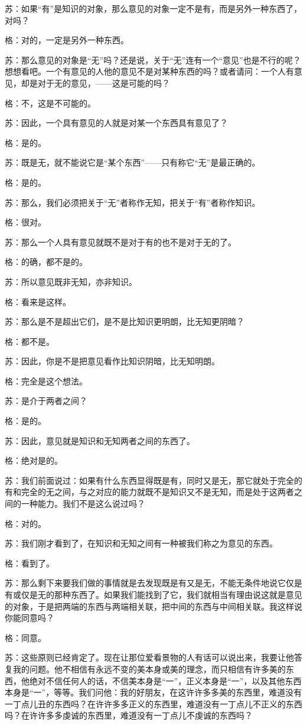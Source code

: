 \documentclass[12pt,oneside]{book}
\begin{document}
苏：如果“有”是知识的对象，那么意见的对象一定不是有，而是另外一种东西了，对吗？

格：对的，一定是另外一种东西。

苏：那么意见的对象是“无”吗？还是说，关于“无”连有一个“意见”也是不行的呢？想想看吧。一个有意见的人他的意见不是对某种东西的吗？或者请问：一个人有意见，却是对于无的意见，——这是可能的吗？

格：不，这是不可能的。

苏：因此，一个具有意见的人就是对某一个东西具有意见了？

格：是的。

苏：既是无，就不能说它是“某个东西”——只有称它“无”是最正确的。

格：是的。

苏：那么，我们必须把关于“无”者称作无知，把关于“有”者称作知识。

格：很对。

苏：那么一个人具有意见就既不是对于有的也不是对于无的了。

格：的确，都不是的。

苏：所以意见既非无知，亦非知识。

格：看来是这样。

苏：那么是不是超出它们，是不是比知识更明朗，比无知更阴暗？

格：都不是。

苏：因此，你是不是把意见看作比知识阴暗，比无知明朗。

格：完全是这个想法。

苏：是介于两者之间？

格：是的。

苏：因此，意见就是知识和无知两者之间的东西了。

格：绝对是的。

苏：我们前面说过：如果有什么东西显得既是有，同时又是无，那它就处于完全的有和完全的无之间，与之对应的能力就既不是知识又不是无知，而是处于这两者之间的一种能力。我们不是这么说过吗？

格：对的。

苏：我们刚才看到了，在知识和无知之间有一种被我们称之为意见的东西。

格：看到了。

苏：那么剩下来要我们做的事情就是去发现既是有又是无，不能无条件地说它仅是有或仅是无的那种东西了。如果我们能找到了它，我们就相当有理由说这就是意见的对象，于是把两端的东西与两端相关联，把中间的东西与中间相关联。我这样说你能同意吗？

格：同意。

苏：这些原则已经肯定了。现在让那位爱看景物的人有话可以说出来，我要让他答复我的问题。他不相信有永远不变的美本身或美的理念，而只相信有许多美的东西，他绝对不信任何人的话，不信美本身是“一”，正义本身是“一”，以及其他东西本身是“一”，等等。我们问他：我的好朋友，在这许许多多美的东西里，难道没有一丁点儿丑的东西吗？在许许多多正义的东西里，难道没有一丁点儿不正义的东西吗？在许许多多虔诚的东西里，难道没有一丁点儿不虔诚的东西吗？
\end{document}
